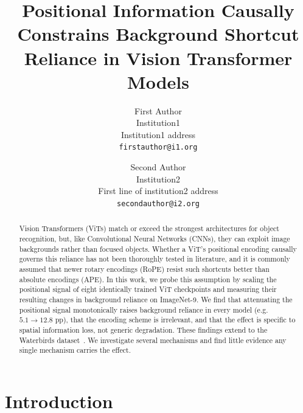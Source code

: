 \documentclass[10pt,twocolumn,letterpaper]{article}
\begin{document}
\title{
Positional Information Causally Constrains Background Shortcut Reliance in Vision Transformer Models
}

\author{First Author\\
Institution1\\
Institution1 address\\
{\tt\small firstauthor@i1.org}
\and
Second Author\\
Institution2\\
First line of institution2 address\\
{\tt\small secondauthor@i2.org}
}
\maketitle

\begin{abstract}
   Vision Transformers (ViTs) match or exceed the strongest architectures for object recognition, but, like Convolutional Neural Networks (CNNs), they can exploit image backgrounds rather than focused objects. Whether a ViT's positional encoding causally governs this reliance has not been thoroughly tested in literature, and it is commonly assumed that newer rotary encodings (RoPE) resist such shortcuts better than absolute encodings (APE). In this work, we probe this assumption by scaling the positional signal of eight identically trained ViT checkpoints and measuring their resulting changes in background reliance on ImageNet-9. We find that attenuating the positional signal monotonically raises background reliance in every model (e.g.\ $5.1 \rightarrow 12.8$ pp), that the encoding scheme is irrelevant, and that the effect is specific to spatial information loss, not generic degradation. These findings extend to the Waterbirds dataset~\cite{sagawa2020}. We investigate several mechanisms and find little evidence any single mechanism carries the effect.
\end{abstract}

\section{Introduction}
\label{sec:intro}
\end{document}
